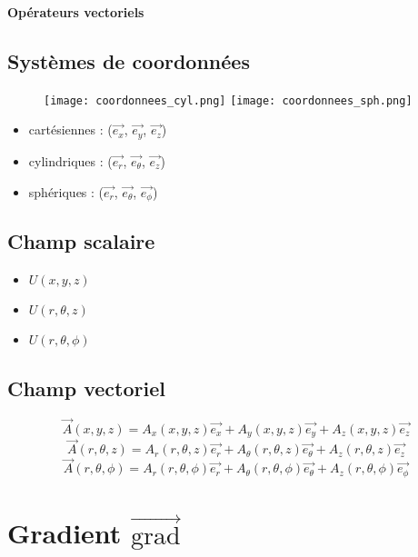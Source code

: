 \documentclass[12pt,a4paper]{article}
\author{Rémi Metzdorff}
\newcommand{\ex}{\overrightarrow{e_x}}
\newcommand{\ey}{\overrightarrow{e_y}}
\newcommand{\ez}{\overrightarrow{e_z}}
\newcommand{\er}{\overrightarrow{e_r}}
\newcommand{\et}{\overrightarrow{e_\theta}}
\newcommand{\ep}{\overrightarrow{e_\phi}}
\newcommand{\grad}{\overrightarrow{\mathrm{grad}}}
\begin{document}
\begin{center}
\Large
\bf
Opérateurs vectoriels
\end{center}

\subsection*{Systèmes de coordonnées}

\begin{figure}[!h]
\center
\hfill
\texttt{[image: coordonnees\_cyl.png]}
\hfill
\texttt{[image: coordonnees\_sph.png]}
\hfill
\hfill
\end{figure}

\begin{itemize}
\item cartésiennes : ($\ex$, $\ey$, $\ez$)
\item cylindriques : ($\er$, $\et$, $\ez$)
\item sphériques : ($\er$, $\et$, $\ep$)
\end{itemize}

\subsection*{Champ scalaire}

\begin{itemize}
\item $U(x,y,z)$
\item $U(r,\theta,z)$
\item $U(r, \theta,\phi)$
\end{itemize}

\subsection*{Champ vectoriel}

\begin{equation*}
\overrightarrow{A}(x,y,z) = A_x(x,y,z)\ex + A_y(x,y,z)\ey + A_z(x,y,z)\ez
\end{equation*}
\begin{equation*}
\overrightarrow{A}(r,\theta,z) = A_r(r,\theta,z)\er + A_\theta(r,\theta,z)\et + A_z(r,\theta,z)\ez
\end{equation*}
\begin{equation*}
\overrightarrow{A}(r,\theta,\phi) = A_r(r,\theta,\phi)\er + A_\theta(r,\theta,\phi)\et + A_z(r,\theta,\phi)\ep
\end{equation*}

\section*{Gradient $\grad$}
\end{document}

